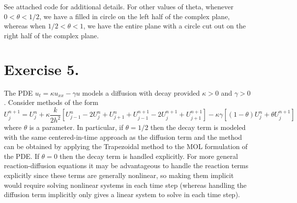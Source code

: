 \documentclass{article}
\begin{document}
\begin{itemize}
\begin{center}
    \end{center}
    See attached code for additional details. For other values of theta, whenever $0 < \theta < 1/2$, we have a filled in circle on the left half of the complex plane, whereas when $1/2 < \theta < 1$, we have the entire plane with a circle cut out on the right half of the complex plane.
    
\end{itemize}

\section*{Exercise 5.}
The PDE $u_t = \kappa u_{xx} - \gamma u$ models a diffusion with decay provided $\kappa > 0$ and $\gamma > 0$.
\newline\newline
Consider methods of the form
\[U_j^{n+1} = U^n_j + \kappa \frac{k}{2h^2}[U^n_{j-1} - 2U^n_j + U_{j+1}^n + U^{n+1}_{j-1} - 2U_j^{n+1} + U_{j+1}^{n+1}] - \kappa \gamma[(1-\theta)U^n_j + \theta U_j^{n+1}]\]
where $\theta$ is a parameter. 
In particular, if $\theta = 1/2$ then the decay term is modeled with the same centered-in-time approach as the diffusion term and the method can be obtained by applying the Trapezoidal method to the MOL formulation of the PDE. 
If $\theta = 0$ then the decay term is handled explicitly. 
For more general reaction-diffusion equations it may be advantageous to handle the reaction terms explicitly since these terms are generally nonlinear, so making them implicit would require solving nonlinear systems in each time step (whereas handling the diffusion term implicitly only gives a linear system to solve in each time step).
\end{document}
